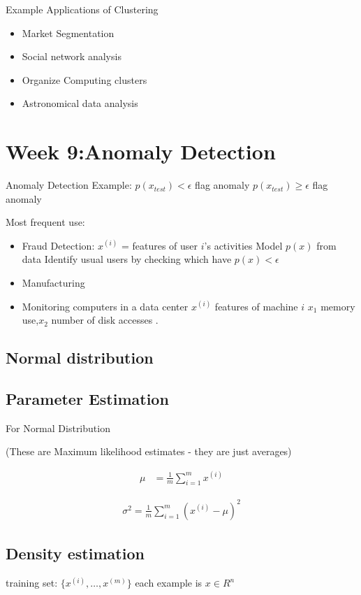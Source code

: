 \documentclass[fontsize=11]{article}
\begin{document}
Example Applications of Clustering
\begin{itemize}
\item Market Segmentation
\item Social network analysis
\item Organize Computing clusters
\item Astronomical data analysis
\end{itemize}



\section{Week 9:Anomaly Detection }
Anomaly Detection Example:
$p(x_{test}) < \epsilon $ flag anomaly
$p(x_{test}) \geq \epsilon $ flag anomaly

Most frequent use: 
\begin{itemize}
\item Fraud Detection:
$x^{(i)}$ = features of user $i$'s activities
Model $p(x)$ from data
Identify usual users by checking which have $p(x) < \epsilon$

\item Manufacturing 

\item Monitoring computers in a data center
$x^{(i)}$ features of machine $i$
$x_1$ memory use,$ x_2$ number of disk accesses .
\end{itemize}

\subsection{Normal distribution}

\subsection{Parameter Estimation}
For Normal Distribution

(These are Maximum likelihood estimates - they are just averages)

\begin{align*}
\mu &= \frac{1}{m} \sum_{i=1}^m x^{(i)}
\end{align*}

\begin{align*}
\sigma^2 = \frac{1}{m} \sum_{i=1}^m  (x^{(i)} - \mu)^2
\end{align*}

\subsection{Density estimation}
training set: $\{x^{(i)},\dots, x^{(m)} \}$
each example is $x \in R^n$
\end{document}
